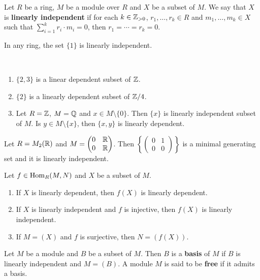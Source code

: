 \begin{definition}
    Let $R$ be a ring, $M$ be a module over $R$ and $X$ be a subset of $M$. We say that
    $X$ is \textbf{linearly independent} if for each $k\in\mathbb{Z}_{>0}$, $r_1,\dots,r_k\in R$
    and $m_1,\dots,m_k\in X$ such that $\sum_{i=1}^kr_i\cdot m_i=0$, then 
    $r_1=\cdots=r_k=0$. 
\end{definition}

In any ring, the set $\{1\}$ is linearly independent. 

\begin{examples}\
\begin{enumerate}
    \item $\{2,3\}$ is a linear dependent subset of $\mathbb{Z}$.
    \item $\{2\}$ is a linearly dependent subset of $\mathbb{Z}/4$.
    \item Let $R=\mathbb{Z}$, $M=\mathbb{Q}$ and $x\in M\setminus\{0\}$. 
        Then $\{x\}$ is linearly independent subset of $M$. Is $y\in M\setminus\{x\}$, then
        $\{x,y\}$ is linearly dependent.  
\end{enumerate}    
\end{examples}

\begin{examples}
Let $R=M_2(\mathbb{R})$ and $M=\begin{pmatrix}
        0&\mathbb{R}\\
        0&\mathbb{R} 
    \end{pmatrix}$. Then $\left\{\begin{pmatrix}0&1\\0&0\end{pmatrix}\right\}$ is a minimal generating 
    set and it is linearly independent. 
\end{examples}

\begin{exercise}
    Let $f\in\operatorname{Hom}_R(M,N)$ and $X$ be a subset of $M$. 
    \begin{enumerate}
        \item If $X$ is linearly dependent, then $f(X)$ is linearly dependent.
        \item If $X$ is linearly independent and $f$ is injective, then $f(X)$ is linearly independent. 
        \item If $M=(X)$ and $f$ is surjective, then $N=(f(X))$. 
    \end{enumerate}
\end{exercise}

\begin{definition}
    Let $M$ be a module and $B$ be a subset of $M$. Then $B$ is a \textbf{basis} of $M$ if
    $B$ is linearly independent and $M=(B)$. A module $M$ is said to be \textbf{free} if it admits a basis.   
\end{definition}

